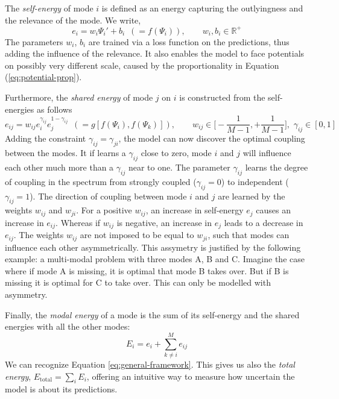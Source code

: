 The \textit{self-energy} of mode $i$ is defined as an energy capturing the outlyingness and the relevance of the mode. We write,
\begin{equation}
e_i = w_i\Psi_i' + b_i\,\,\, (=f(\Psi_i)), \qquad w_i, b_i \in \mathbb{R}^+
\end{equation}
The parameters $w_i$, $b_i$ are trained via a loss function on the predictions, thus adding the influence of the relevance. It also enables the model to face potentials on possibly very different scale, caused by the proportionality in Equation (\ref{eq:potential-prop}).

Furthermore, the \textit{shared energy} of mode $j$ on $i$ is constructed from the self-energies as follows
\begin{equation}
e_{ij} = w_{ij}e_i^{\gamma_{ij}}e_j^{1-\gamma_{ij}}\,\,\, (=g[f(\Psi_i), f(\Psi_k)]), \qquad w_{ij} \in \bigg[-\frac{1}{M-1}, +\frac{1}{M-1}\bigg],\,\, \gamma_{ij} \in [0,1]
\end{equation}
Adding the constraint $\gamma_{ij} = \gamma_{ji}$, the model can now discover the optimal coupling between the modes. It if learns a $\gamma_{ij}$ close to zero, mode $i$ and $j$ will influence each other much more than a $\gamma_{ij}$ near to one. The parameter $\gamma_{ij}$ learns the degree of coupling in the spectrum from strongly coupled ($\gamma_{ij}=0$) to independent ($\gamma_{ij} = 1$). The direction of coupling between mode $i$ and $j$ are learned by the weights $w_{ij}$ and $w_{ji}$. For a positive $w_{ij}$, an increase in self-energy $e_j$ causes an increase in $e_{ij}$. Whereas if $w_{ij}$ is negative, an increase in $e_j$ leads to a decrease in $e_{ij}$. The weights $w_{ij}$ are not imposed to be equal to $w_{ji}$, such that modes can influence each other asymmetrically. This assymetry is justified by the following example: a multi-modal problem with three modes A, B and C. Imagine the case where if mode A is missing, it is optimal that mode B takes over. But if B is missing it is optimal for C to take over. This can only be modelled with asymmetry.

Finally, the \textit{modal energy} of a mode is the sum of its self-energy and the shared energies with all the other modes:
\begin{equation}
E_i = e_i + \sum_{k\neq i}^M e_{ij}
\end{equation}
We can recognize Equation \ref{eq:general-framework}. This gives us also the \textit{total energy}, $E_{\text{total}} = \sum_i E_i$, offering an intuitive way to measure how uncertain the model is about its predictions.

